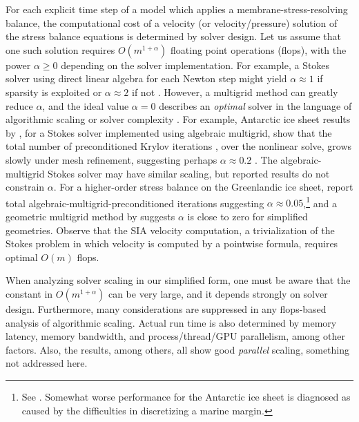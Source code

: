 \documentclass[review,letterpaper]{igs}
\begin{document}
For each explicit time step of a model which applies a membrane-stress-resolving balance, the computational cost of a velocity (or velocity/pressure) solution of the stress balance equations is determined by solver design.  Let us assume that one such solution requires $O(m^{1+\alpha})$ floating point operations (flops),  with the power $\alpha\ge 0$ depending on the solver implementation.  For example, a Stokes solver using direct linear algebra for each Newton step might yield $\alpha \approx 1$ if sparsity is exploited or $\alpha \approx 2$ if not \citep{Bueler2021}.  However, a multigrid method \citep{Trottenbergetal2001} can greatly reduce $\alpha$, and the ideal value $\alpha=0$ describes an \emph{optimal} solver in the language of algorithmic scaling or solver complexity \citep{Bueler2021}.  For example, Antarctic ice sheet results by \cite{IsaacStadlerGhattas2015}, for a Stokes solver implemented using algebraic multigrid, show that the total number of preconditioned Krylov iterations \citep{Bueler2021}, over the nonlinear solve, grows slowly under mesh refinement, suggesting perhaps $\alpha\approx 0.2$ \citep[Table 8.1]{IsaacStadlerGhattas2015}.  The \cite{Lengetal2012} algebraic-multigrid Stokes solver may have similar scaling, but reported results do not constrain $\alpha$.  For a higher-order stress balance on the Greenlandic ice sheet, \cite{Tuminaroetal2016} report total algebraic-multigrid-preconditioned iterations suggesting $\alpha \approx 0.05$,\footnote{See \citep[Table 7.5]{Tuminaroetal2016}.  Somewhat worse performance for the Antarctic ice sheet is diagnosed as caused by the difficulties in discretizing a marine margin.} and a geometric multigrid method by \citep{BrownSmithAhmadia2013} suggests $\alpha$ is close to zero for simplified geometries.  Observe that the SIA velocity computation, a trivialization of the Stokes problem in which velocity is computed by a pointwise formula, requires optimal $O(m)$ flops.

When analyzing solver scaling in our simplified form, one must be aware that the constant in $O(m^{1+\alpha})$ can be very large, and it depends strongly on solver design.  Furthermore, many considerations are suppressed in any flops-based analysis of algorithmic scaling.  Actual run time is also determined by memory latency, memory bandwidth, and process/thread/GPU parallelism, among other factors.  Also, the \cite{BrownSmithAhmadia2013,Fischleretal2022,IsaacStadlerGhattas2015,Lengetal2012,Tuminaroetal2016} results, among others, all show good \emph{parallel} scaling, something not addressed here.
\end{document}
